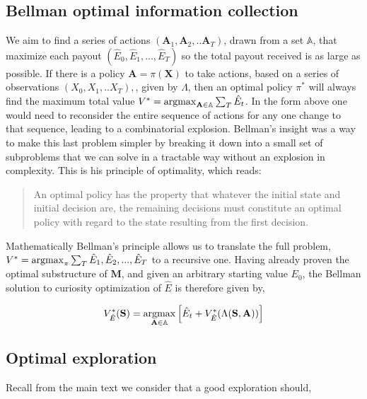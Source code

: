 \subsection*{Bellman optimal information collection}
We aim to find a series of actions $(\mathbf{A}_1, \mathbf{A}_2, ..\mathbf{A}_T)$, drawn from a set $\mathbb{A}$, that maximize each payout $(\hat E_0, \hat E_1, \ldots, \hat E_{T})$ so the total payout received is as large as possible. If there is a policy $\mathbf{A} = \pi(\mathbf{X})$ to take actions, based on a series of observations $(X_0, X_1, ..X_{T}),$, given by $\Lambda$, then an optimal policy $\pi^*$ will always find the maximum total value $V^* = \operatorname*{argmax}_{\mathbf{A} \in \mathbb{A}} \sum_T \hat E_t $. In the form above one would need to reconsider the entire sequence of actions for any one change to that sequence, leading to a combinatorial explosion. Bellman's insight was a way to make this last problem simpler by breaking it down into a small set of subproblems that we can solve in a tractable way without an explosion in complexity. This is his principle of optimality, which reads:

\begin{quote}
    An optimal policy has the property that whatever the initial state and initial decision are, the remaining decisions must constitute an optimal policy with regard to the state resulting from the first decision. \cite{Bellmann1954}
\end{quote}

Mathematically Bellman's principle allows us to translate the full problem, $V^* = \operatorname*{argmax}_{\pi} \sum_T \hat E_1, \hat E_2, ..., \hat E_{T}$ to a recursive one. Having already proven the optimal substructure of $\mathbf{M}$, and given an arbitrary starting value $E_0$, the Bellman solution to curiosity optimization of $\hat E$ is therefore given by,

\begin{equation} 
	\label{eq:bellman_iter_E_app}
	V^*_{\hat E}(\mathbf{S}) = \operatorname*{argmax}_{\mathbf{A} \in \mathbb{A}} \Big [ \hat E_{t}  + V^*_{\hat E}(\Lambda(\mathbf{S},\mathbf{A})) \Big ]
\end{equation}


\subsection*{Optimal exploration} 

Recall from the main text we consider that a good exploration should,

